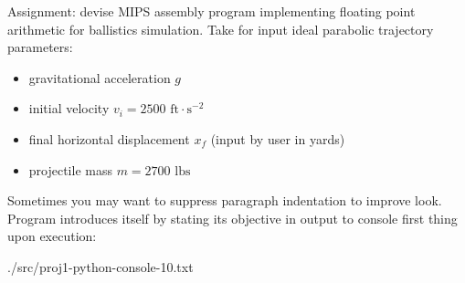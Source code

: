 Assignment: devise MIPS assembly program
implementing floating point arithmetic
for ballistics simulation.
Take for input ideal parabolic trajectory parameters:

\begin{itemize}
    \item gravitational acceleration $g$
    \item initial velocity 
    $v_i = 2500 \text{ ft}\cdot\text{s}^{-2}$
    \item final horizontal displacement 
    $x_f $ (input by user in yards)
    \item projectile mass 
    $m = 2700 \text{ lbs}$
\end{itemize}

\noindent 
Sometimes you may want to 
suppress paragraph indentation
to improve look.
Program introduces itself
by stating its objective
in output to console
first thing upon execution:


{./src/proj1-python-console-10.txt}